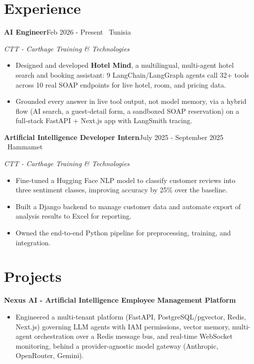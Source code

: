 \documentclass[11pt,a4paper]{article}
\newcommand{\entry}[2]{\textbf{#1}\hfill{\small\color{muted}#2}\par}
\newcommand{\org}[1]{{\itshape\color{muted}#1}\par}
\newcommand{\proj}[1]{\textbf{#1}\par}
\begin{document}
\section{Experience}
\entry{AI Engineer}{Feb 2026 - Present \textperiodcentered\ Tunisia}
\org{CTT - Carthage Training \& Technologies}
\begin{itemize}
  \item Designed and developed \textbf{Hotel Mind}, a multilingual, multi-agent hotel search and booking assistant: 9 LangChain/LangGraph agents call 32+ tools across 10 real SOAP endpoints for live hotel, room, and pricing data.
  \item Grounded every answer in live tool output, not model memory, via a hybrid flow (AI search, a guest-detail form, a sandboxed SOAP reservation) on a full-stack FastAPI + Next.js app with LangSmith tracing.
\end{itemize}
\vspace{3pt}
\entry{Artificial Intelligence Developer Intern}{July 2025 - September 2025 \textperiodcentered\ Hammamet}
\org{CTT - Carthage Training \& Technologies}
\begin{itemize}
  \item Fine-tuned a Hugging Face NLP model to classify customer reviews into three sentiment classes, improving accuracy by 25\% over the baseline.
  \item Built a Django backend to manage customer data and automate export of analysis results to Excel for reporting.
  \item Owned the end-to-end Python pipeline for preprocessing, training, and integration.
\end{itemize}

\section{Projects}

\proj{Nexus AI - Artificial Intelligence Employee Management Platform}
\begin{itemize}
  \item Engineered a multi-tenant platform (FastAPI, PostgreSQL/pgvector, Redis, Next.js) governing LLM agents
        with IAM permissions, vector memory, multi-agent orchestration over a Redis message bus, and
        real-time WebSocket monitoring, behind a provider-agnostic model gateway (Anthropic, OpenRouter, Gemini).
\end{itemize}
\end{document}
